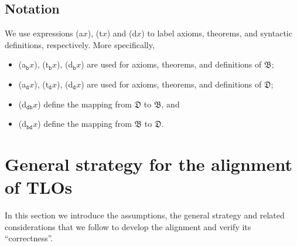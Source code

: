 \documentclass[ao]{iosart2x}
\newcommand{\bfoAxLabel}{\textrm{a$_\texttt{b}$}}
\newcommand{\bfoDefLabel}{\textrm{d$_\texttt{b}$}}
\newcommand{\bfoThrLabel}{\textrm{t$_\texttt{b}$}}
\newcommand{\dolceAxLabel}{\textrm{a$_\texttt{d}$}}
\newcommand{\dolceDefLabel}{\textrm{d$_\texttt{d}$}}
\newcommand{\dolceThrLabel}{\textrm{t$_\texttt{d}$}}
\newcommand{\dbDefLabel}{\textrm{d$_\texttt{db}$}}
\newcommand{\dbThrLabel}{\textrm{t$_\texttt{db}$}}
\newcommand{\dbAxLabel}{\textrm{a}$_\texttt{db}$}
\newcommand{\bdDefLabel}{\textrm{d$_\texttt{bd}$}}
\newcommand{\bdThrLabel}{\textrm{t$_\texttt{bd}$}}
\newcommand{\bdAxLabel}{\textrm{a}$_\texttt{bd}$}
\newcommand{\dolce}{{\textsc{dolce}}}
\newcommand{\bfo}{{\textsc{bfo}}}
\newcommand {\thdolce} {\ensuremath{\mathfrak{D}}}
\newcommand {\thbfo} {\ensuremath{\mathfrak{B}}}
\begin{document}
\subsection{Notation}
We use expressions ({\rm a}$x$), ({\rm t}$x$) and ({\rm d}$x$) to label axioms, theorems, and syntactic definitions, respectively. More specifically,
\begin{itemize}
\item (\bfoAxLabel $x$), (\bfoThrLabel $x$), (\bfoDefLabel $x$) are used for axioms, theorems, and definitions of {$\thbfo$}; 
\item (\dolceAxLabel $x$), (\dolceThrLabel $x$), (\dolceDefLabel $x$) are used for axioms, theorems, and definitions of {$\thdolce$}; 
\item %
(\dbDefLabel $x$) define %
the mapping  from ${\thdolce}$ to ${\thbfo}$, and
\item %
(\bdDefLabel $x$) define %
the mapping  from ${\thbfo}$ to ${\thdolce}$.  
\end{itemize}


\section{General strategy for the alignment of TLOs}\label{sect_methodology}


In this section we introduce the assumptions, the general strategy  and related considerations that we follow to develop the alignment and verify its ``correctness''.
\end{document}
